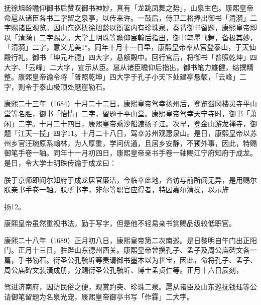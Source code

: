 \noindent 抚徐旭龄瞻仰御书后赞叹御书神妙，真有「龙跳凤舞之势」，山泉生色。康熙皇帝命扈从诸臣各书二字留之泉亭，以传来许。一鼓后，侍卫二格捧出御书「清漪」二字赐诸臣观览。因山东巡抚徐旭龄以衙署内有珍珠泉，奏请御书留题，康熙皇帝即以「清漪」二字赐之。大学士明珠等瞻仰宸翰后指出，御书笔墨飞舞，备极其妙，「清漪」二字，意义尤美1°。同年十月十一日早，康熙皇帝率从官登泰山，于天仙殿行礼，御书「坤元叶德」四大字，悬额殿中。回行宫后，将御书「普照乾坤」四大字、「云峰」二大字，宣示从臣。扈从诸臣瞻仰后指出，御书笔力雄健，结撰精整。康熙皇帝谕令将「普照乾坤」四大字于孔子小天下处建亭悬额，「云峰」二字，则令于泰山极顶处磨崖勒石。

康熙二十三年（1684）十月二十二日，康熙皇帝驾幸扬州后，登览蜀冈楼灵寺平山堂等名胜，御书「怡情」二字，留题于平山堂。康熙皇帝驾幸天宁寺时，御书「萧闲」二字。十月二十四日，康熙皇帝乘沙船渡扬子江。次早，登金山游龙禅寺，御题「江天一揽」四字11。十月二十八日，驾幸苏州观惠泉山。是日，康熙皇帝以苏州乡官汪琬原系翰林，为人厚重，学问优通，且居乡安静，不预外事，因此，特赐御笔手卷一轴。同年十一月初四日，康熙皇帝亲书手卷一轴赐江宁府知府于成龙。是日，令大学士明珠传谕于成龙曰：

\begin{BookQuote}
朕于京师即闻尔知府于成龙居官廉洁，今临幸此地，咨访与前所闻无异，是用赐尔朕亲书手卷一轴。朕所书字，非尔等职官应得者，特因嘉尔清操，以示旌
\end{BookQuote}

扬12。

康熙皇帝虽然重视书法，勤于写字，但是他不轻易亲书赏赐品级较低职官。

康熙二十八年（1689）正月初八日，康熙皇帝第二次南巡。是日黎明自午门出正阳门。正月十三日，驻跸山东德州西关。康熙皇帝曾撰孔子、孟子及周公庙碑文各一篇，手书勒石。衍圣公孔毓圻等奏请御书墨本以为世宝，因此，命将孔子、孟子、周公庙碑文装潢成册，分赐衍圣公孔毓圻、博士孟贞仁等。正月十六日辰刻，

\vfill
\begin{BookNotes}
\end{BookNotes}

\noindent 驾进济南府，因访民俗之便，观赏趵突、珍珠二泉。扈从诸臣及山东巡抚钱珏等公请御笔留题为名泉光宠，康熙皇帝御亭书写「作霖」二大字。

